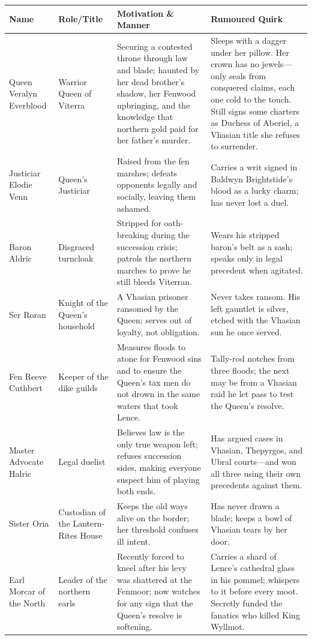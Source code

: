 \begin{longtable}{|p{}|p{}|p{}|p{}|}
\hline
\textbf{Name} & \textbf{Role/Title} & \textbf{Motivation \& Manner} & \textbf{Rumoured Quirk} \\
\hline
Queen Veralyn Everblood & Warrior Queen of Viterra & Securing a contested throne through law and blade; haunted by her dead brother's shadow, her Fenwood upbringing, and the knowledge that northern gold paid for her father's murder. & Sleeps with a dagger under her pillow. Her crown has no jewels---only seals from conquered claims, each one cold to the touch. Still signs some charters as Duchess of Aberiel, a Vhasian title she refuses to surrender. \\
\hline
Justiciar Elodie Venn & Queen's Justiciar & Raised from the fen marshes; defeats opponents legally and socially, leaving them ashamed. & Carries a writ signed in Baldwyn Brightstide's blood as a lucky charm; has never lost a duel. \\
\hline
Baron Aldric & Disgraced turncloak & Stripped for oath-breaking during the succession crisis; patrols the northern marches to prove he still bleeds Viterran. & Wears his stripped baron's belt as a sash; speaks only in legal precedent when agitated. \\
\hline
Ser Roran & Knight of the Queen's household & A Vhasian prisoner ransomed by the Queen; serves out of loyalty, not obligation. & Never takes ransom. His left gauntlet is silver, etched with the Vhasian sun he once served. \\
\hline
Fen Reeve Cuthbert & Keeper of the dike guilds & Measures floods to atone for Fenwood sins and to ensure the Queen's tax men do not drown in the same waters that took Lence. & Tally-rod notches from three floods; the next may be from a Vhasian raid he let pass to test the Queen's resolve. \\
\hline
Master Advocate Halric & Legal duelist & Believes law is the only true weapon left; refuses succession sides, making everyone suspect him of playing both ends. & Has argued cases in Vhasian, Thepyrgos, and Ubral courts---and won all three using their own precedents against them. \\
\hline
Sister Oria & Custodian of the Lantern-Rites House & Keeps the old ways alive on the border; her threshold confuses ill intent. & Has never drawn a blade; keeps a bowl of Vhasian tears by her door. \\
\hline
Earl Morcar of the North & Leader of the northern earls & Recently forced to kneel after his levy was shattered at the Fenmoor; now watches for any sign that the Queen's resolve is softening. & Carries a shard of Lence's cathedral glass in his pommel; whispers to it before every moot. Secretly funded the fanatics who killed King Wyllmot. \\
\hline
\end{longtable}

